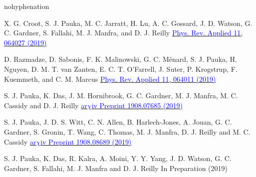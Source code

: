\begin{hyphenrules}{nohyphenation}
\begin{sloppypar}
      {X. G. Croot, S. J. Pauka, M. C. Jarratt, H. Lu, A. C. Gossard, J. D. Watson, G. C. Gardner, S. Fallahi, M. J. Manfra, and D. J. Reilly}
      {\href{https://doi.org/\detokenize{10.1103/PhysRevApplied.11.064027}}{\textcolor{blue}{Phys. Rev. Applied 11, 064027 (2019)}}}

      {D. Razmadze, D. Sabonis, F. K. Malinowski, G. C. Ménard, S. J. Pauka, H. Nguyen, D. M. T. van Zanten, E. C. T. O'Farrell, J. Suter, P. Krogstrup, F. Kuemmeth, and C. M. Marcus}
      {\href{https://doi.org/\detokenize{10.1103/PhysRevApplied.11.064011}}{\textcolor{blue}{Phys. Rev. Applied 11, 064011 (2019)}}}

      {S. J. Pauka, K. Das, J. M. Hornibrook, G. C. Gardner, M. J. Manfra, M. C. Cassidy and D. J. Reilly}
      {\href{https://arxiv.org/abs/1908.07685}{\textcolor{blue}{ar$χ$iv Preprint 1908.07685 (2019)}}}

      {S. J. Pauka, J. D. S. Witt, C. N. Allen, B. Harlech-Jones, A. Jouan, G. C. Gardner, S. Gronin, T. Wang, C. Thomas, M. J. Manfra, D. J. Reilly and M. C. Cassidy}
      {\href{https://arxiv.org/abs/1908.08689}{\textcolor{blue}{ar$χ$iv Preprint 1908.08689 (2019)}}}

      {S. J. Pauka, K. Das, R. Kalra, A. Moini, Y. Y. Yang, J. D. Watson, G. C. Gardner, S. Fallahi, M. J. Manfra and D. J. Reilly}
      {In Preparation (2019)}

      \makeatletter
      \let\parskip=\old@parskip
      \makeatother
  \end{sloppypar}
\end{hyphenrules}
\newpage\null\newpage

\makeatletter
\let\chapter\old@chapter
\let\@makeschapterhead\old@makeschapterhead
\makeatother